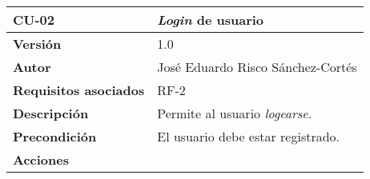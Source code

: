 \strut
\
\strut
\begin{longtable}[H]{@{}ll@{}}
\toprule
\begin{minipage}[b]{0.23\columnwidth}\raggedright\strut
\textbf{CU-02}\strut
\end{minipage} & \begin{minipage}[b]{0.71\columnwidth}\raggedright\strut
\textbf{\emph{Login} de usuario}\strut
\end{minipage}\tabularnewline
\midrule
\endhead
\begin{minipage}[t]{0.23\columnwidth}\raggedright\strut
\textbf{Versión}\strut
\end{minipage} & \begin{minipage}[t]{0.71\columnwidth}\raggedright\strut
1.0\strut
\end{minipage}\tabularnewline
\begin{minipage}[t]{0.23\columnwidth}\raggedright\strut
\textbf{Autor}\strut
\end{minipage} & \begin{minipage}[t]{0.71\columnwidth}\raggedright\strut
José Eduardo Risco Sánchez-Cortés\strut
\end{minipage}\tabularnewline
\begin{minipage}[t]{0.23\columnwidth}\raggedright\strut
\textbf{Requisitos asociados}\strut
\end{minipage} & \begin{minipage}[t]{0.71\columnwidth}\raggedright\strut
RF-2\strut
\end{minipage}\tabularnewline
\begin{minipage}[t]{0.23\columnwidth}\raggedright\strut
\textbf{Descripción}\strut
\end{minipage} & \begin{minipage}[t]{0.71\columnwidth}\raggedright\strut
Permite al usuario \emph{logearse}.\strut
\end{minipage}\tabularnewline
\begin{minipage}[t]{0.23\columnwidth}\raggedright\strut
\textbf{Precondición}\strut
\end{minipage} & \begin{minipage}[t]{0.71\columnwidth}\raggedright\strut
El usuario debe estar registrado.\strut
\end{minipage}\tabularnewline
\begin{minipage}[t]{0.23\columnwidth}\raggedright\strut
\textbf{Acciones}\strut
\end{minipage} & \begin{minipage}[t]{0.71\columnwidth}\raggedright\strut

\end{minipage}
\end{longtable}
